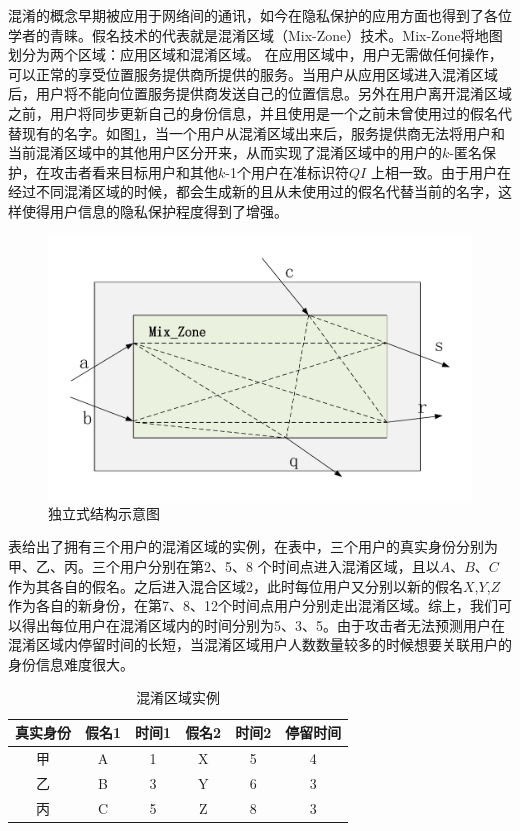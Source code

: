 混淆的概念早期被应用于网络间的通讯，如今在隐私保护的应用方面也得到了各位学者的青睐。假名技术的代表就是混淆区域（Mix-Zone）技术。Mix-Zone将地图划分为两个区域：应用区域和混淆区域\cite{Mix}。 在应用区域中，用户无需做任何操作，可以正常的享受位置服务提供商所提供的服务。当用户从应用区域进入混淆区域后，用户将不能向位置服务提供商发送自己的位置信息。另外在用户离开混淆区域之前，用户将同步更新自己的身份信息，并且使用是一个之前未曾使用过的假名代替现有的名字。如图\ref{fig:mix_zone_pdf}，当一个用户从混淆区域出来后，服务提供商无法将用户和当前混淆区域中的其他用户区分开来，从而实现了混淆区域中的用户的$k$-匿名保护，在攻击者看来目标用户和其他$k$-1个用户在准标识符$QI$ 上相一致。由于用户在经过不同混淆区域的时候，都会生成新的且从未使用过的假名代替当前的名字，这样使得用户信息的隐私保护程度得到了增强。
\begin{figure}[H]
\centering
\includegraphics[width=14cm]{fig/mix_zone.pdf}
\caption{独立式结构示意图} %
\label{fig:mix_zone_pdf}
\end{figure}
表给出了拥有三个用户的混淆区域的实例，在表中，三个用户的真实身份分别为甲、乙、丙。三个用户分别在第2、5、8 个时间点进入混淆区域，且以$A$、$B$、$C$ 作为其各自的假名。之后进入混合区域2，此时每位用户又分别以新的假名$X$,$Y$,$Z$作为各自的新身份，在第7、8、12个时间点用户分别走出混淆区域。综上，我们可以得出每位用户在混淆区域内的时间分别为5、3、5。由于攻击者无法预测用户在混淆区域内停留时间的长短，当混淆区域用户人数数量较多的时候想要关联用户的身份信息难度很大。
\begin{table}[tbp]
\centering  %
\begin{tabular}{cccccc}  %
\hline
真实身份 &假名1&时间1 &假名2&时间2&停留时间\\ \hline  %
甲 &A &1 &X &5 &4\\         %
乙 &B &3 &Y &6 &3\\        %
丙 &C &5 &Z &8 &3\\ \hline
\end{tabular}
\caption{混淆区域实例}
\end{table}

